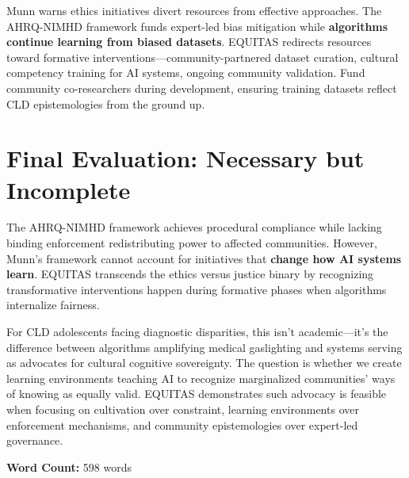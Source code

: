 \documentclass[11pt,twoside]{article}
\begin{document}
Munn warns ethics initiatives divert resources from effective approaches. The AHRQ-NIMHD framework funds expert-led bias mitigation while \textbf{algorithms continue learning from biased datasets}. EQUITAS redirects resources toward formative interventions—community-partnered dataset curation, cultural competency training for AI systems, ongoing community validation. Fund community co-researchers during development, ensuring training datasets reflect CLD epistemologies from the ground up.

\section{Final Evaluation: Necessary but Incomplete}

The AHRQ-NIMHD framework achieves procedural compliance while lacking binding enforcement redistributing power to affected communities. However, Munn's framework cannot account for initiatives that \textbf{change how AI systems learn}. EQUITAS transcends the ethics versus justice binary by recognizing transformative interventions happen during formative phases when algorithms internalize fairness.

For CLD adolescents facing diagnostic disparities, this isn't academic—it's the difference between algorithms amplifying medical gaslighting and systems serving as advocates for cultural cognitive sovereignty. The question is whether we create learning environments teaching AI to recognize marginalized communities' ways of knowing as equally valid. EQUITAS demonstrates such advocacy is feasible when focusing on cultivation over constraint, learning environments over enforcement mechanisms, and community epistemologies over expert-led governance.

\vspace{1em}

\noindent\textbf{Word Count:} 598 words
\end{document}
